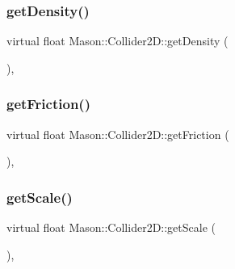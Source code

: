 \subsubsection{\texorpdfstring{get\+Density()}{getDensity()}}
{\footnotesize\ttfamily virtual float Mason\+::\+Collider2\+D\+::get\+Density (\begin{DoxyParamCaption}{ }\end{DoxyParamCaption})\hspace{0.3cm}{\ttfamily [inline]}, {\ttfamily [virtual]}}

\hypertarget{class_mason_1_1_collider2_d_a51dc3e85d605474a71c3b8c7949affef}{}\label{class_mason_1_1_collider2_d_a51dc3e85d605474a71c3b8c7949affef} 
\subsubsection{\texorpdfstring{get\+Friction()}{getFriction()}}
{\footnotesize\ttfamily virtual float Mason\+::\+Collider2\+D\+::get\+Friction (\begin{DoxyParamCaption}{ }\end{DoxyParamCaption})\hspace{0.3cm}{\ttfamily [inline]}, {\ttfamily [virtual]}}

\hypertarget{class_mason_1_1_collider2_d_a370216fb8ccfe760adfc3365ac41ff8e}{}\label{class_mason_1_1_collider2_d_a370216fb8ccfe760adfc3365ac41ff8e} 
\subsubsection{\texorpdfstring{get\+Scale()}{getScale()}}
{\footnotesize\ttfamily virtual float Mason\+::\+Collider2\+D\+::get\+Scale (\begin{DoxyParamCaption}{ }\end{DoxyParamCaption})\hspace{0.3cm}{\ttfamily [inline]}, {\ttfamily [virtual]}}

\hypertarget{class_mason_1_1_collider2_d_a077061bfa5c7a8c80e78042f9a421a49}{}\label{class_mason_1_1_collider2_d_a077061bfa5c7a8c80e78042f9a421a49} 
